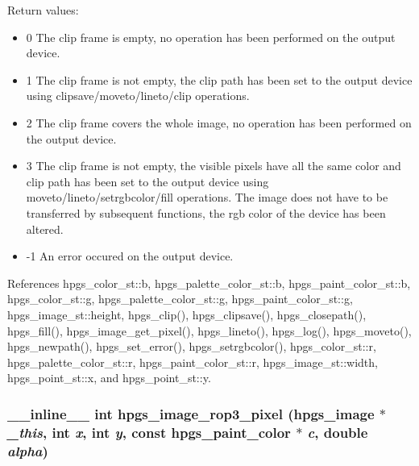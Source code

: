 Return values: \begin{itemize}
\item 0 The clip frame is empty, no operation has been performed on the output device.\end{itemize}
\begin{itemize}
\item 1 The clip frame is not empty, the clip path has been set to the output device using clipsave/moveto/lineto/clip operations.\end{itemize}
\begin{itemize}
\item 2 The clip frame covers the whole image, no operation has been performed on the output device.\end{itemize}
\begin{itemize}
\item 3 The clip frame is not empty, the visible pixels have all the same color and clip path has been set to the output device using moveto/lineto/setrgbcolor/fill operations. The image does not have to be transferred by subsequent functions, the rgb color of the device has been altered.\end{itemize}
\begin{itemize}
\item -1 An error occured on the output device. \end{itemize}


References hpgs\_\-color\_\-st::b, hpgs\_\-palette\_\-color\_\-st::b, hpgs\_\-paint\_\-color\_\-st::b, hpgs\_\-color\_\-st::g, hpgs\_\-palette\_\-color\_\-st::g, hpgs\_\-paint\_\-color\_\-st::g, hpgs\_\-image\_\-st::height, hpgs\_\-clip(), hpgs\_\-clipsave(), hpgs\_\-closepath(), hpgs\_\-fill(), hpgs\_\-image\_\-get\_\-pixel(), hpgs\_\-lineto(), hpgs\_\-log(), hpgs\_\-moveto(), hpgs\_\-newpath(), hpgs\_\-set\_\-error(), hpgs\_\-setrgbcolor(), hpgs\_\-color\_\-st::r, hpgs\_\-palette\_\-color\_\-st::r, hpgs\_\-paint\_\-color\_\-st::r, hpgs\_\-image\_\-st::width, hpgs\_\-point\_\-st::x, and hpgs\_\-point\_\-st::y.
\subsubsection[hpgs\_\-image\_\-rop3\_\-pixel]{\setlength{\rightskip}{0pt plus 5cm}\_\-\_\-inline\_\-\_\- int hpgs\_\-image\_\-rop3\_\-pixel ({\bf hpgs\_\-image} $\ast$ {\em \_\-this}, \/  int {\em x}, \/  int {\em y}, \/  const {\bf hpgs\_\-paint\_\-color} $\ast$ {\em c}, \/  double {\em alpha})\hspace{0.3cm}{\tt  [static]}}\label{group__image_g62487d780b695de88ea0c944fef61894}


